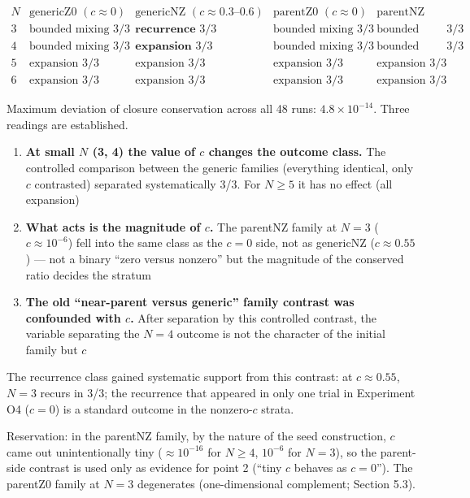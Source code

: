 \documentclass[
  a4paper,
]{article}
\providecommand{\tightlist}{%
  \setlength{\itemsep}{0pt}\setlength{\parskip}{0pt}}
\begin{document}
\[
\begin{array}{c|cccc}
N & \text{genericZ0 }(c\approx0) & \text{genericNZ }(c\approx0.3\text{–}0.6) & \text{parentZ0 }(c\approx0) & \text{parentNZ}\\\hline
3 & \text{bounded mixing }3/3 & \textbf{recurrence }3/3 & \text{bounded mixing }3/3 & \text{bounded mixing }3/3\\
4 & \text{bounded mixing }3/3 & \textbf{expansion }3/3 & \text{bounded mixing }3/3 & \text{bounded mixing }3/3\\
5 & \text{expansion }3/3 & \text{expansion }3/3 & \text{expansion }3/3 & \text{expansion }3/3\\
6 & \text{expansion }3/3 & \text{expansion }3/3 & \text{expansion }3/3 & \text{expansion }3/3
\end{array}
\]

Maximum deviation of closure conservation across all 48 runs:
\(4.8\times10^{-14}\). Three readings are established.

\begin{enumerate}
\def\labelenumi{\arabic{enumi}.}
\tightlist
\item
  \textbf{At small \(N\) (3, 4) the value of \(c\) changes the outcome
  class.} The controlled comparison between the generic families
  (everything identical, only \(c\) contrasted) separated systematically
  3/3. For \(N\ge5\) it has no effect (all expansion)
\item
  \textbf{What acts is the magnitude of \(c\).} The parentNZ family at
  \(N=3\) (\(c\approx10^{-6}\)) fell into the same class as the \(c=0\)
  side, not as genericNZ (\(c\approx0.55\)) --- not a binary ``zero
  versus nonzero'' but the magnitude of the conserved ratio decides the
  stratum
\item
  \textbf{The old ``near-parent versus generic'' family contrast was
  confounded with \(c\).} After separation by this controlled contrast,
  the variable separating the \(N=4\) outcome is not the character of
  the initial family but \(c\)
\end{enumerate}

The recurrence class gained systematic support from this contrast: at
\(c\approx0.55\), \(N=3\) recurs in 3/3; the recurrence that appeared in
only one trial in Experiment O4 (\(c=0\)) is a standard outcome in the
nonzero-\(c\) strata.

Reservation: in the parentNZ family, by the nature of the seed
construction, \(c\) came out unintentionally tiny (\(\approx10^{-16}\)
for \(N\ge4\), \(10^{-6}\) for \(N=3\)), so the parent-side contrast is
used only as evidence for point 2 (``tiny \(c\) behaves as \(c=0\)'').
The parentZ0 family at \(N=3\) degenerates (one-dimensional complement;
Section 5.3).
\end{document}
